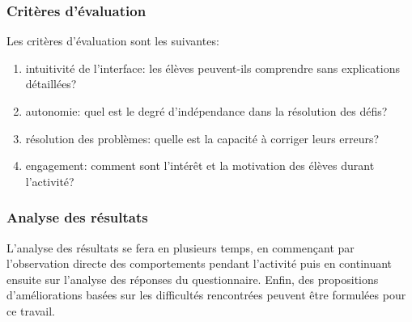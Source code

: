 \subsubsection{Critères d’évaluation}
Les critères d'évaluation sont les suivantes:
\begin{enumerate}
    \item intuitivité de l'interface: les élèves peuvent-ils comprendre sans explications détaillées?
    \item autonomie: quel est le degré d'indépendance dans la résolution des défis?
    \item résolution des problèmes: quelle est la capacité à corriger leurs erreurs?
    \item engagement: comment sont l'intérêt et la motivation des élèves durant l'activité?
\end{enumerate}

\subsubsection{Analyse des résultats}
L'analyse des résultats se fera en plusieurs temps, en commençant par l'observation directe des comportements pendant l'activité puis en continuant ensuite sur l'analyse des réponses du questionnaire.
Enfin, des propositions d'améliorations basées sur les difficultés rencontrées peuvent être formulées pour ce travail.
